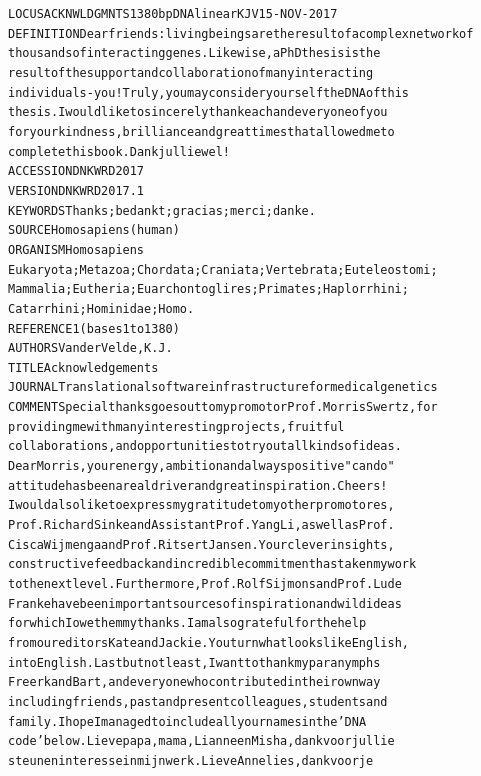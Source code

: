 \begin{appendices}
\begin{alltt}
\ssmall
LOCUS       ACKNWLDGMNTS            1380 bp    DNA    linear    KJV 15-NOV-2017
DEFINITION  Dear friends: living beings are the result of a complex network of
            thousands of interacting genes. Likewise, a PhD thesis is the
            result of the support and collaboration of many interacting
            individuals - you! Truly, you may consider yourself the DNA of this
            thesis. I would like to sincerely thank each and every one of you
            for your kindness, brilliance and great times that allowed me to
            complete this book. Dank jullie wel!
ACCESSION   DNKWRD2017
VERSION     DNKWRD2017.1
KEYWORDS    Thanks; bedankt; gracias; merci; danke.
SOURCE      Homo sapiens (human)
  ORGANISM  Homo sapiens
            Eukaryota; Metazoa; Chordata; Craniata; Vertebrata; Euteleostomi;
            Mammalia; Eutheria; Euarchontoglires; Primates; Haplorrhini;
            Catarrhini; Hominidae; Homo.
REFERENCE   1  (bases 1 to 1380)
  AUTHORS   Van der Velde,K.J.
  TITLE     Acknowledgements
  JOURNAL   Translational software infrastructure for medical genetics
COMMENT     Special thanks goes out to my promotor Prof. Morris Swertz, for
            providing me with many interesting projects, fruitful
            collaborations, and opportunities to try out all kinds of ideas.
            Dear Morris, your energy, ambition and always positive "can do"
            attitude has been a real driver and great inspiration. Cheers!
            I would also like to express my gratitude to my other promotores,
            Prof. Richard Sinke and Assistant Prof. Yang Li, as well as Prof.
            Cisca Wijmenga and Prof. Ritsert Jansen. Your clever insights,
            constructive feedback and incredible commitment has taken my work
            to the next level. Furthermore, Prof. Rolf Sijmons and Prof. Lude
            Franke have been important sources of inspiration and wild ideas
            for which I owe them my thanks. I am also grateful for the help
            from our editors Kate and Jackie. You turn what looks like English,
            into English. Last but not least, I want to thank my paranymphs
            Freerk and Bart, and everyone who contributed in their own way
            including friends, past and present colleagues, students and
            family. I hope I managed to include all your names in the 'DNA
            code' below. Lieve papa, mama, Lianne en Misha, dank voor jullie
            steun en interesse in mijn werk. Lieve Annelies, dank voor je

\end{alltt}
\end{appendices}
